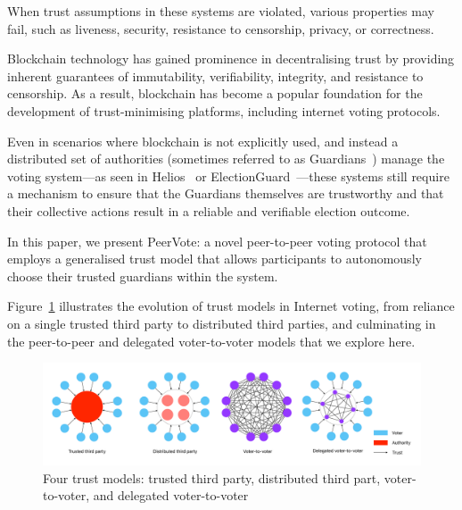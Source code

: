 \documentclass[runningheads]{llncs}
\begin{document}
When trust assumptions in these systems are violated, various properties may fail, such as liveness, security, resistance to censorship, privacy, or correctness.

Blockchain technology has gained prominence in decentralising trust by providing inherent guarantees of immutability, verifiability, integrity, and resistance to censorship. As a result, blockchain has become a popular foundation for the development of trust-minimising platforms, including internet voting protocols.

Even in scenarios where blockchain is not explicitly used, and instead a distributed set of authorities (sometimes referred to as Guardians~\cite{benalohElectionGuardDesignSpecification2023}) manage the voting system—as seen in Helios~\cite{adidaHeliosWebbasedOpenAudit2008} or ElectionGuard~\cite{benalohElectionGuardDesignSpecification2023}—these systems still require a mechanism to ensure that the Guardians themselves are trustworthy and that their collective actions result in a reliable and verifiable election outcome.

In this paper, we present PeerVote: a novel peer-to-peer voting protocol that employs a generalised trust model that allows participants to autonomously choose their trusted guardians within the system. 

Figure~\ref{fig:trust-models} illustrates the evolution of trust models in Internet voting, from reliance on a single trusted third party to distributed third parties, and culminating in the peer-to-peer and delegated voter-to-voter models that we explore here.

\begin{figure}
    \centering
    \includegraphics[width=\textwidth]{trust-models-voting.pdf}
    \caption{Four trust models: trusted third party, distributed third part, voter-to-voter, and delegated voter-to-voter}
    \label{fig:trust-models}
\end{figure}
\end{document}
